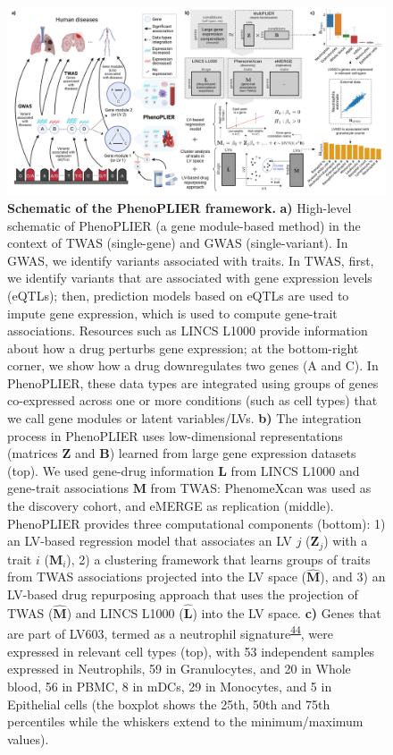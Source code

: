 \documentclass[
  a4paper,
]{article}
\begin{document}
\begin{figure}
\hypertarget{fig:entire_process}{%
\centering
\includegraphics[width=1\textwidth,height=\textheight]{images/entire_process/entire_process.pdf}
\caption{\textbf{Schematic of the PhenoPLIER framework.}
\textbf{a)} High-level schematic of PhenoPLIER (a gene module-based method) in the context of TWAS (single-gene) and GWAS (single-variant).
In GWAS, we identify variants associated with traits.
In TWAS, first, we identify variants that are associated with gene expression levels (eQTLs); then, prediction models based on eQTLs are used to impute gene expression, which is used to compute gene-trait associations.
Resources such as LINCS L1000 provide information about how a drug perturbs gene expression; at the bottom-right corner, we show how a drug downregulates two genes (A and C).
In PhenoPLIER, these data types are integrated using groups of genes co-expressed across one or more conditions (such as cell types) that we call gene modules or latent variables/LVs.
\textbf{b)} The integration process in PhenoPLIER uses low-dimensional representations (matrices \(\mathbf{Z}\) and \(\mathbf{B}\)) learned from large gene expression datasets (top).
We used gene-drug information \(\mathbf{L}\) from LINCS L1000 and gene-trait associations \(\mathbf{M}\) from TWAS: PhenomeXcan was used as the discovery cohort, and eMERGE as replication (middle).
PhenoPLIER provides three computational components (bottom):
1) an LV-based regression model that associates an LV \(j\) (\(\mathbf{Z}_j\)) with a trait \(i\) (\(\mathbf{M}_i\)),
2) a clustering framework that learns groups of traits from TWAS associations projected into the LV space (\(\hat{\mathbf{M}}\)),
and 3) an LV-based drug repurposing approach that uses the projection of TWAS (\(\hat{\mathbf{M}}\)) and LINCS L1000 (\(\hat{\mathbf{L}}\)) into the LV space.
\textbf{c)} Genes that are part of LV603, termed as a neutrophil signature\textsuperscript{\protect\hyperlink{ref-14rnBunuZ}{44}}, were expressed in relevant cell types (top), with 53 independent samples expressed in Neutrophils, 59 in Granulocytes, and 20 in Whole blood, 56 in PBMC, 8 in mDCs, 29 in Monocytes, and 5 in Epithelial cells (the boxplot shows the 25th, 50th and 75th percentiles while the whiskers extend to the minimum/maximum values).
}}
\end{figure}
\end{document}

